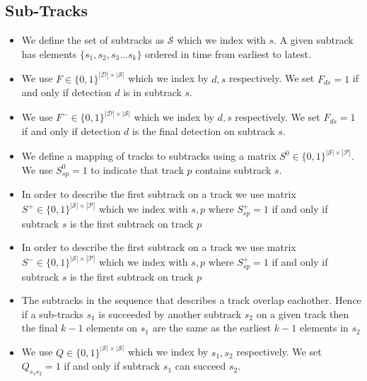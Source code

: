 \documentclass{article}
\begin{document}
 \subsection{Sub-Tracks }
   \begin{itemize}
\item 
We define the set of subtracks as $\mathcal{S}$ which we index with $s$.  A given subtrack has elements $\{s_1,s_2,s_3...s_k\}$ ordered in time from earliest to latest.  
\item
We use $F \in \{ 0,1\}^{|\mathcal{D}| \times |\mathcal{S}|}$ which we index by $d,s$ respectively.   We set $F_{ds}=1$ if and only if detection $d$ is in subtrack $s $.  
\item
We use $F^- \in \{ 0,1\}^{|\mathcal{D}| \times |\mathcal{S}|}$ which we index by $d,s$ respectively.   We set $F_{ds}=1$ if and only if detection $d$ is the final detection on subtrack $s$.  
\item 
We define a mapping of tracks to subtracks using a matrix $S^0 \in \{0,1 \}^{|\mathcal{S}|\times |\mathcal{P}|}$.  We use $S^0_{sp}=1$ to indicate that track $p$ contains subtrack $s$.  
\item 
In order to describe the first subtrack on a  track we use matrix $S^+ \in \{0,1 \}^{|\mathcal{S}|\times |\mathcal{P}|}$ which we index with $s,p$ where $S^+_{sp}=1$ if and only if subtrack $s$ is the first subtrack on track $p$
\item 
In order to describe the first subtrack on a  track we use matrix $S^- \in \{0,1 \}^{|\mathcal{S}|\times |\mathcal{P}|}$ which we index with  $s,p$ where $S^+_{sp}=1$ if and only if subtrack $s$ is the first subtrack on track $p$

\item 
The subtracks in the sequence that describes a track overlap eachother.  Hence if a sub-tracks $s_1$ is succeeded by another subtrack $s_2$ on a given track then the final $k-1$ elements on $s_1$ are the same as the earliest $k-1$ elements in $s_2$
\item
We use $Q \in \{ 0,1\}^{|\mathcal{S}| \times |\mathcal{S}|}$ which we index by $s_1,s_2$ respectively.   We set $Q_{s_1s_2}=1$ if and only if subtrack $s_1$ can succeed $s_2$.  
\end{itemize}
\end{document}
